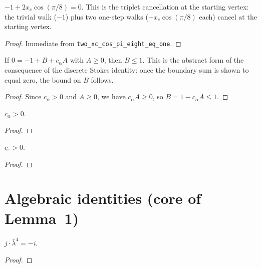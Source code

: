 \begin{lemma}\label{lem:start_vertex_rel}
\leanok
{}
  $-1 + 2x_c\cos(\pi/8) = 0$.
  This is the triplet cancellation at the starting vertex:
  the trivial walk ($-1$) plus two one-step walks ($+x_c\cos(\pi/8)$ each)
  cancel at the starting vertex.
\end{lemma}
\begin{proof}
\leanok
  Immediate from \texttt{two\_xc\_cos\_pi\_eight\_eq\_one}.
\end{proof}

\begin{lemma}\label{lem:boundary_sum}
\leanok
{}
  If $0 = -1 + B + c_\alpha A$ with $A \geq 0$, then $B \leq 1$.
  This is the abstract form of the consequence of the discrete Stokes identity:
  once the boundary sum is shown to equal zero, the bound on $B$ follows.
\end{lemma}
\begin{proof}
\leanok
  Since $c_\alpha > 0$ and $A \geq 0$, we have $c_\alpha A \geq 0$,
  so $B = 1 - c_\alpha A \leq 1$.
\end{proof}

\begin{lemma}\label{lem:c_alpha_pos}
\leanok
{}
  $c_\alpha > 0$.
\end{lemma}
\begin{proof}
\leanok
\end{proof}

\begin{lemma}\label{lem:c_eps_pos}
\leanok
{}
  $c_\varepsilon > 0$.
\end{lemma}
\begin{proof}
\leanok
\end{proof}


\section{Algebraic identities (core of Lemma~1)}

\begin{lemma}[$j \bar{\lambda}^4 = -i$]\label{lem:j_conj_lam_4}
\leanok
{}
  $j \cdot \bar{\lambda}^4 = -i$.
\end{lemma}
\begin{proof}
\leanok
\end{proof}

